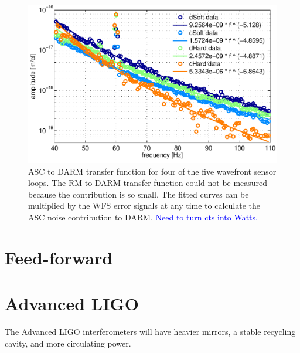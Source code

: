 \begin{figure}
\begin{centering}
\includegraphics[width=1.0\columnwidth]{figures/ASC2DARM_TFs.pdf}
\caption{ASC to DARM transfer function for four of the five wavefront
  sensor loops. The RM to DARM transfer function could not be measured
  because the contribution is so small. The fitted curves can be
  multiplied by the WFS error signals at any time to calculate the ASC
  noise contribution to DARM. \textcolor{blue}{Need to turn cts into Watts.}}
\end{centering}
\end{figure}




\section{Feed-forward}


\section{Advanced LIGO}
The Advanced LIGO interferometers will have heavier mirrors, a stable
recycling cavity, and more circulating power. 